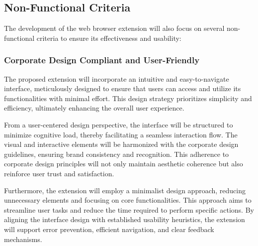 \subsection{Non-Functional Criteria}
The development of the web browser extension will also focus on several non-functional criteria to ensure its effectiveness and usability:

\subsubsection{Corporate Design Compliant and User-Friendly}
\label{subsec:nf-criteria:design}
The proposed extension will incorporate an intuitive and easy-to-navigate interface, meticulously designed to ensure that users can access and utilize its functionalities with minimal effort. This design strategy prioritizes simplicity and efficiency, ultimately enhancing the overall user experience.

From a user-centered design perspective, the interface will be structured to minimize cognitive load, thereby facilitating a seamless interaction flow. The visual and interactive elements will be harmonized with the corporate design guidelines, ensuring brand consistency and recognition. This adherence to corporate design principles will not only maintain aesthetic coherence but also reinforce user trust and satisfaction.

Furthermore, the extension will employ a minimalist design approach, reducing unnecessary elements and focusing on core functionalities. This approach aims to streamline user tasks and reduce the time required to perform specific actions. By aligning the interface design with established usability heuristics, the extension will support error prevention, efficient navigation, and clear feedback mechanisms.


